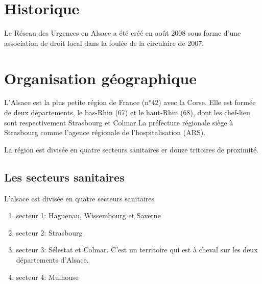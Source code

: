 \documentclass[12pt,english,french,twoside]{report}\usepackage[]{graphicx}\usepackage[]{color}
\begin{document}
\chapter{Historique}


Le Réseau des Urgences en Alsace a été créé en août 2008 sous forme d'une association de droit local dans la foulée de la circulaire de 2007.



\newpage
\chapter{Organisation géographique}


L'Alsace est la plus petite région de France (n°42) avec la Corse. Elle est formée de deux départements, le bas-Rhin (67) et le haut-Rhin (68), dont les chef-lieu sont respectivement Strasbourg et Colmar.La préfecture régionale siège à Strasbourg comme l'agence régionale de l'hospitalisation  (ARS).

La région est divisée en quatre secteurs sanitaires er douze tritoires de proximité.

\section{Les secteurs sanitaires}

L'alsace est divisée en quatre secteurs sanitaires
\begin{enumerate}
  \item secteur 1: Haguenau, Wissembourg et Saverne
  \item secteur 2: Strasbourg
  \item secteur 3: Sélestat et Colmar. C'est un territoire qui est à cheval sur les deux départements d'Alsace.
  \item secteur 4: Mulhouse
\end{enumerate}
\end{document}
